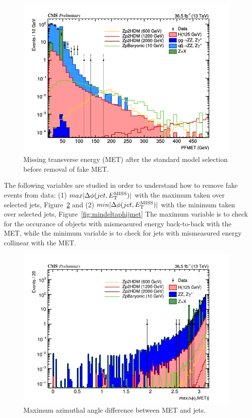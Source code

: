 \begin{figure}[tbh]
\centering
\includegraphics[width=5in]{figures/hist_hPFMET_8.png}
\caption{Missing transverse energy (MET) after the standard model selection before removal of fake MET.}
\label{fig:pfmet_m4lblinded}
\end{figure}

The following variables are studied in order to understand how to remove fake events from data: (1) $max|\Delta\phi(jet, E_{\rm{T}}^{\rm{MISS}})|$ with the maximum taken over selected jets, Figure~\ref{fig:maxdeltaphijmet} and (2) $min|\Delta\phi(jet, E_{\rm{T}}^{\rm{MISS}})|$ with the minimum taken over selected jets, Figure~\ref{fig:mindeltaphijmet}
The maximum variable is to check for the occurance of objects with mismeasured energy back-to-back with the MET, while the minimum variable is to check for jets with mismeasured energy collinear with the MET.

\begin{figure}[tbh]
\centering
\includegraphics[width=5in]{figures/hist_hDPHI_MAX_JET_MET_8.png}
\caption{Maximum azimuthal angle difference between MET and jets.}
\label{fig:maxdeltaphijmet}
\end{figure}

